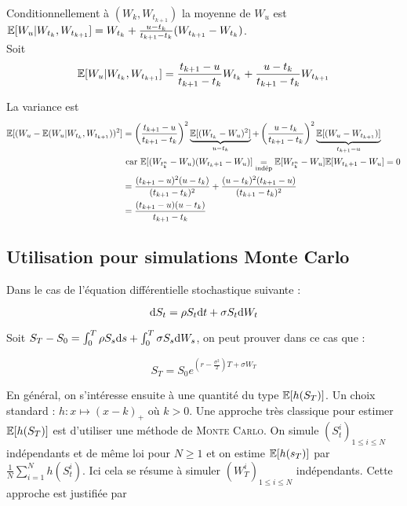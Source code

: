 Conditionnellement à $(W_k, W_{t_{k+1}})$ la moyenne de $W_u$ est $\mathbb{E}[W_u \vert W_{t_k}, W_{t_{k+1}}] = W_{t_k} + \frac{u-t_k}{t_{k+1} - t_k}(W_{t_{k+1}} - W_{t_k})$. \\

Soit 
\begin{equation*}
\begin{split}
  \mathbb{E}[W_u \vert W_{t_k}, W_{t_{k+1}}] = \frac{t_{k+1} - u}{t_{k+1} - t_k} W_{t_k} + \frac{u - t_k}{t_{k+1} -t_k} W_{t_{k+1}}
\end{split}
\end{equation*}

La variance est 
\begin{equation*}
\begin{split}
  \mathbb{E}[(W_u - \mathbb{E}(W_u \vert W_{t_k}, W_{t_{k+1}}))^2] &= \left(\frac{t_{k+1} - u}{t_{k+1}-t_k}\right)^2  \underbrace{\mathbb{E}[(W_{t_k}-W_u)^2]}_{u-t_k} + \left( \frac{u-t_k}{t_{k+1} - t_k} \right)^2 \underbrace{\mathbb{E}[(W_u-W_{t_{k+1}})]}_{t_{k+1} - u} \\
  &\text{ car } \mathbb{E}[(W_{t_k^n} - W_u)(W_{t_k+1} - W_u)] \underset{\text{indép}}{=} \mathbb{E}[W_{t_k^n} - W_u]\mathbb{E}[W_{t_k+1} - W_u] = 0 \\ 
  &= \frac{(t_{k+1}-u)^2 (u-t_k)}{(t_{k+1} - t_k)^2} + \frac{(u-t_k)^2 (t_{k+1}-u)}{(t_{k+1} - t_k)^2} \\
  &= \frac{(t_{k+1}-u)(u-t_k)}{t_{k+1} - t_k}
\end{split}
\end{equation*}

\subsection{Utilisation pour simulations Monte Carlo}
Dans le cas de l'équation différentielle stochastique suivante :

\[ \mathrm{d} S_t = \rho S_t \mathrm{d} t + \sigma S_t \mathrm{d} W_t \]

Soit $S_T - S_0 = \int_{0}^{T} \rho S_s \mathrm{d} s + \int_{0}^{T} \sigma S_s \mathrm{d} W_s$, on peut prouver dans ce cas que :

\[ S_T = S_0 e^{\left(r- \frac{\sigma^2}{2}\right)T + \sigma W_T} \]

En général, on s'intéresse ensuite à une quantité du type $\mathbb{E}[h(S_T)]$. Un choix standard : $h : x \mapsto (x-k)_+$ où $k>0$. Une approche très classique pour estimer $\mathbb{E}[h(S_T)]$ est d'utiliser une méthode de \textsc{Monte Carlo}. On simule $(S_t^i)_{1\leq i \leq N}$ indépendants et de même loi pour $N \geq 1$ et on estime $\mathbb{E}[h(s_T)]$ par $ \frac{1}{N} \sum_{i=1}^{N} h(S_t^i)$. Ici cela se résume à simuler $(W_T^i)_{1 \leq i \leq N}$ indépendants. Cette approche est justifiée par 

